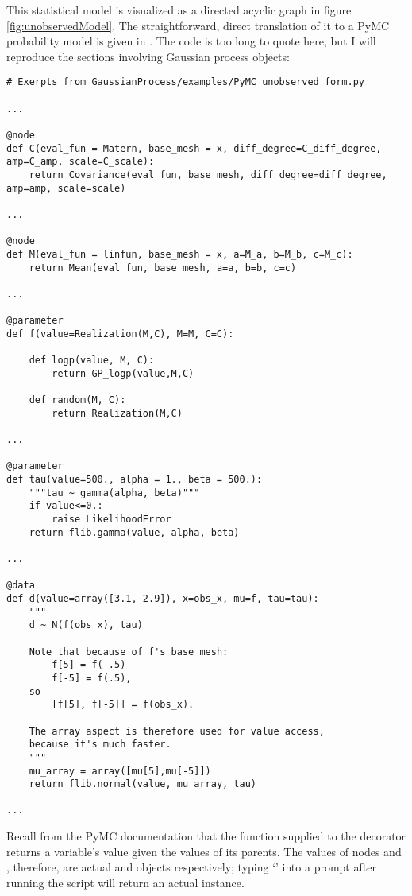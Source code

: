 \documentclass{manual}
\begin{document}
This statistical model is visualized as a directed acyclic graph in figure \ref{fig:unobservedModel}. The straightforward, direct translation of it to a PyMC probability model is given in . The code is too long to quote here, but I will reproduce the sections involving Gaussian process objects:
\begin{verbatim}
# Exerpts from GaussianProcess/examples/PyMC_unobserved_form.py	
	
...	
	
@node
def C(eval_fun = Matern, base_mesh = x, diff_degree=C_diff_degree, amp=C_amp, scale=C_scale):
    return Covariance(eval_fun, base_mesh, diff_degree=diff_degree, amp=amp, scale=scale)

...

@node
def M(eval_fun = linfun, base_mesh = x, a=M_a, b=M_b, c=M_c):
    return Mean(eval_fun, base_mesh, a=a, b=b, c=c)

...

@parameter
def f(value=Realization(M,C), M=M, C=C):

    def logp(value, M, C):
        return GP_logp(value,M,C)

    def random(M, C):
        return Realization(M,C)

...

@parameter
def tau(value=500., alpha = 1., beta = 500.):
    """tau ~ gamma(alpha, beta)"""
    if value<=0.:
        raise LikelihoodError
    return flib.gamma(value, alpha, beta)

...

@data
def d(value=array([3.1, 2.9]), x=obs_x, mu=f, tau=tau):
    """
    d ~ N(f(obs_x), tau)

    Note that because of f's base mesh:
        f[5] = f(-.5)
        f[-5] = f(.5),
    so
        [f[5], f[-5]] = f(obs_x).
        
    The array aspect is therefore used for value access,
    because it's much faster.
    """
    mu_array = array([mu[5],mu[-5]])
    return flib.normal(value, mu_array, tau)

...
\end{verbatim}

Recall from the PyMC documentation that the function supplied to the  decorator returns a variable's value given the values of its parents. The values of nodes  and , therefore, are actual  and  objects respectively; typing `' into a prompt after running the script will return an actual  instance. 
\end{document}
